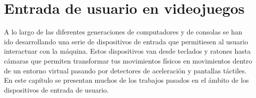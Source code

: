 %
%
%
%
%
%
%
%
%
%

\chapter{Entrada de usuario en videojuegos}
\label{cap2}

\begin{FraseCelebre}
\begin{Frase}
\end{Frase}
\begin{Fuente}
\end{Fuente}
\end{FraseCelebre}

A lo largo de las diferentes generaciones de computadores y de consolas se han ido desarrollando una serie de dispositivos de entrada que permitiesen al usuario interactuar con la m\'aquina. Estos dispositivos van desde teclados y ratones hasta c\'amaras que permiten transformar tus movimientos f\'isicos en movimientos dentro de un entorno virtual pasando por detectores de aceleraci\'on y pantallas t\'actiles. En este cap\'itulo se presentan muchos de los trabajos pasados en el \'ambito de los dispositivos de entrada de usuario.
